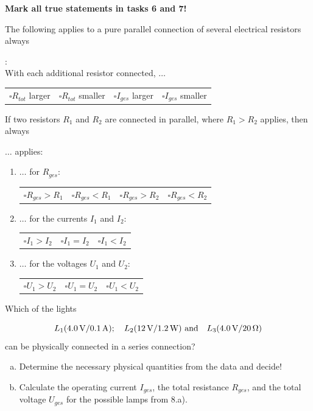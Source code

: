 \documentclass[a4paper]{article}
\begin{document}
\begin{enumerate}[1.]
		{\bf Mark all true statements in tasks 6 and 7!}
		
		{\bf \item The following applies to a pure parallel connection of several electrical resistors always}:\\
		
		With each additional resistor connected, $\dots$\\
		
		\begin{tabular}{p{75 pt}p{75 pt}p{75 pt}p{75 pt}}
			$\square R_{tot}$ larger& $\square R_{tot}$ smaller&
			$\square I_{ges}$ larger & $\square I_{ges}$ smaller
		\end{tabular}
		
	{\bf	\item If two resistors $R_1$ and $R_2$ are connected in parallel, where $R_1>R_2$ applies, then  always} $\dots$ applies:
		\begin{enumerate}
			\item $\dots$ for $R_{ges}$:
			
			\begin{tabular}{p{75 pt}p{75 pt}p{75 pt}p{75 pt}}
				$\square R_{ges}>R_1 $&$ \square R_{ges}<R_1 $&$
				\square R_{ges}>R_2 $&$ \square R_{ges}<R_2 $
			\end{tabular}
			
			\item $\dots$ for the currents $I_1$ and $I_2$:
			
			\begin{tabular}{p{100 pt}p{100 pt}p{100 pt}}
				$\square I_1>I_2 $ & $ \square I_1=I_2 $ & $ \square I_1 <I_2 $
			\end{tabular}
			
			\item $\dots$ for the voltages $U_1$ and $U_2$:
			
			\begin{tabular}{p{100 pt}p{100 pt}p{100 pt}}
				$\square U_1>U_2 $ & $ \square U_1=U_2 $ & $ \square U_1 <U_2 $
			\end{tabular}
		\end{enumerate}
		
		{\bf \item Which of the lights }
		$$L_1 ( \SI{4,0}{\volt} / \SI{0,1}{\ampere}); \quad L_2 (\SI{12}{\volt} / \SI{1,2}{\watt})
		~\textnormal{and} \quad L_3 (\SI{4,0}{\volt} / \SI{20}{\ohm})$$
		can be physically connected in a series connection?
		\begin{enumerate}[a)]
			\item Determine the necessary physical quantities from the data and decide!
			\item Calculate the operating current $I_{ges}$, the total resistance $R_{ges}$, and the total voltage $U_{ges}$ for the possible lamps from 8.a).
		\end{enumerate}
		

\end{enumerate}
\end{document}
